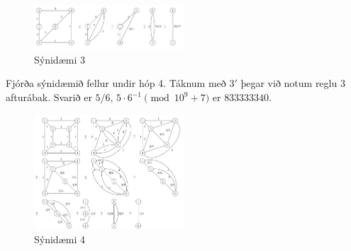 \begin{figure}[h!]
  \centering
    \includegraphics[width=0.5\textwidth]{sample3}
  \caption{Sýnidæmi 3}
\end{figure}

Fjórða sýnidæmið fellur undir hóp 4. Táknum með $3'$ þegar við notum reglu $3$ afturábak. Svarið er $5/6$, $5 \cdot 6^{-1} \pmod{10^9+7}$ er $833333340$. \\

\begin{figure}[h!]
  \centering
    \includegraphics[width=0.5\textwidth]{sample4}
  \caption{Sýnidæmi 4}
\end{figure}
